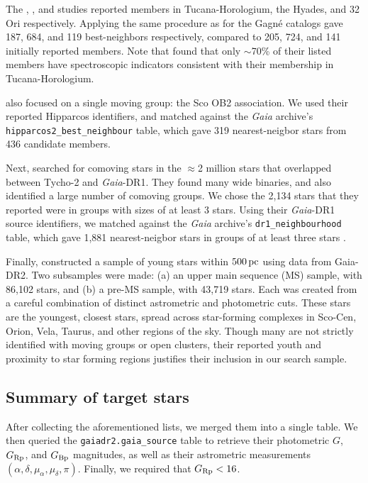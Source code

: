 \documentclass[12pt,twocolumn,tighten]{aastex62}
\begin{document}
The \citet{kraus_tucanahor_2014}, \citet{roser_deep_2011}, and
\citet{bell_32ori_2017} studies reported members in Tucana-Horologium,
the Hyades, and 32$\,$Ori respectively.  Applying the same procedure as
for the Gagn\'e catalogs gave 187, 684, and 119 best-neighbors
respectively, compared to 205, 724, and 141 initially reported
members.  Note that \citet{kraus_tucanahor_2014} found that only
$\sim$70\% of their listed members have spectroscopic indicators
consistent with their membership in Tucana-Horologium.

\citet{rizzuto_multidimensional_2011} also focused on a single moving
group: the Sco OB2 association. We used their reported Hipparcos
identifiers, and matched against the {\it Gaia} archive's
\texttt{hipparcos2\_best\_neighbour} table, which gave 319
nearest-neigbor stars from 436 candidate members.

Next, \citet{oh_comoving_2017} searched for comoving stars in the
$\approx$2 million stars that overlapped between Tycho-2 and {\it
Gaia}-DR1.  They found many wide binaries, and also identified a large
number of comoving groups.  We chose the 2{,}134 stars that they
reported were in groups with sizes of at least 3 stars.  Using their
{\it Gaia}-DR1 source identifiers, we matched against the {\it Gaia}
archive's \texttt{dr1\_neighbourhood} table, which gave 1{,}881
nearest-neigbor stars in groups of at least three stars
\citep{marrese_gaia_2019}.

Finally, \citet{zari_3d_2018} constructed a sample of young stars
within $500\,{\rm pc}$ using data from Gaia-DR2. Two subsamples were
made: (a) an upper main sequence (MS) sample, with 86{,}102 stars, and
(b) a pre-MS sample, with 43{,}719 stars.  Each was created from a
careful combination of distinct astrometric and photometric cuts.
These stars are the youngest, closest stars, spread across
star-forming complexes in Sco-Cen, Orion, Vela, Taurus, and other
regions of the sky.  Though many are not strictly identified with
moving groups or open clusters, their reported youth and proximity to star
forming regions justifies their inclusion in our search sample.




\subsection{Summary of target stars}
\label{subsec:ocmgsummary}


After collecting the aforementioned lists, we
merged them into a single table. We then queried the
\texttt{gaiadr2.gaia\_source} table to retrieve their photometric $G$,
$G_{\rm Rp}$, and $G_{\rm Bp}$ magnitudes, as well as their
astrometric measurements $(\alpha, \delta, \mu_\alpha, \mu_\delta,
\pi)$.  Finally, we required that $G_{\rm Rp} < 16$.  
\end{document}
